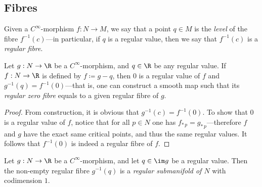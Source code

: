 \subsection{Fibres}

\begin{definition}
\label{def:fibres-and-levels}
Given a \(C^{\infty}\)-morphism \(f: N \to M\), we say that a point \(q \in M\)
is the \emph{level} of the fibre \(f^{-1}(c)\)---in particular, if \(q\) is a
regular value, then we say that \(f^{-1}(c)\) is a \emph{regular fibre}.
\end{definition}

\begin{lemma}
\label{lem:regular-fibre-equal-zero-regular-fibre}
Let \(g: N \to \R\) be a \(C^{\infty}\)-morphism, and \(q \in \R\) be any
regular value. If \(f: N \to \R\) is defined by \(f \coloneq g - q\), then
\(0\) is a regular value of \(f\) and \(g^{-1}(q) = f^{-1}(0)\)---that is, one
can construct a smooth map such that its \emph{regular zero fibre} equals to a
given regular fibre of \(g\).
\end{lemma}

\begin{proof}
From construction, it is obvious that \(g^{-1}(c) = f^{-1}(0)\). To show that
\(0\) is a regular value of \(f\), notice that for all \(p \in N\) one has
\(f_{*\, p} = g_{*\, p}\)---therefore \(f\) and \(g\) have the exact same
critical points, and thus the same regular values. It follows that \(f^{-1}(0)\)
is indeed a regular fibre of \(f\).
\end{proof}

\begin{lemma}
\label{lem:regular-fibres-are-regular-manifolds}
Let \(g: N \to \R\) be a \(C^{\infty}\)-morphism, and let \(q \in \im g\) be a
regular value. Then the non-empty regular fibre \(g^{-1}(q)\) is a \emph{regular
  submanifold of \(N\)} with codimension \(1\).
\end{lemma}

